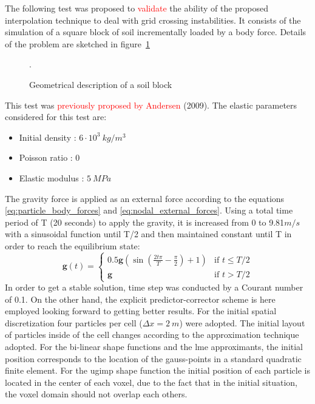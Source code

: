 \documentclass[preprint,12pt,a4paper]{elsarticle}
\newcommand{\PNA}[1]{
  \textcolor{red}{{#1}}
}
\begin{document}
The following test was proposed to \PNA{validate}  the ability of the proposed
interpolation technique to deal with grid crossing instabilities. It
consists of the simulation of a square block of soil incrementally
loaded by a body force. Details of the problem are sketched in figure~\ref{fig:block}
\begin{figure}\sidecaption
  \centering
  \resizebox{0.7\hsize}{!}{
    }
  \caption{Geometrical description of a soil block }.
  \label{fig:block}
\end{figure}
This test was  \PNA{previously proposed by Andersen} (2009)\cite{thesis_Andersen_2009}. The
elastic parameters considered for this test are: 
\begin{itemize} 
\item  Initial density : $6\cdot 10^3\ kg/m^3$
\item  Poisson ratio : $0$
\item  Elastic modulus : $5\ MPa$
\end{itemize}
The gravity force is applied as an external force according to the
equations \eqref{eq:particle_body_forces} and
\eqref{eq:nodal_external_forces}. Using a total time period of T (20
seconds) to apply the gravity, it is increased from 0 to 9.81$m/s$
with a sinusoidal function until T/2 and then maintained constant until T
in order to reach the equilibrium state:
\begin{equation}
  \label{eq:gravity-load-block}
 \mathbf{g}(t) = \left\{
    \begin{array}{ll}
      0.5 \mathbf{g} (\sin(\frac{2t \pi}{T} - \frac{\pi}{2})+1)  & \mbox{if } t \leq T/2 \\
      \mathbf{g} & \mbox{if } t > T/2
    \end{array}
  \right.
\end{equation}
In order to get a stable solution, time step was conducted by a
Courant number of 0.1. On the other hand, the explicit
predictor-corrector scheme is here employed looking forward to getting better results. For the
initial spatial discretization four particles per cell
($\Delta x = 2\ m$) were adopted. The initial layout of particles inside of the
cell changes according to the approximation technique adopted. For the
bi-linear shape functions and the \acrshort{lme} approximants, the initial
position corresponds to the location of the gauss-points in a standard
quadratic finite element. For the \acrshort{ugimp} shape function the initial
position of each particle is located in the center of each voxel, due
to the fact that in the initial situation, the voxel domain should not
overlap each others.
\end{document}
